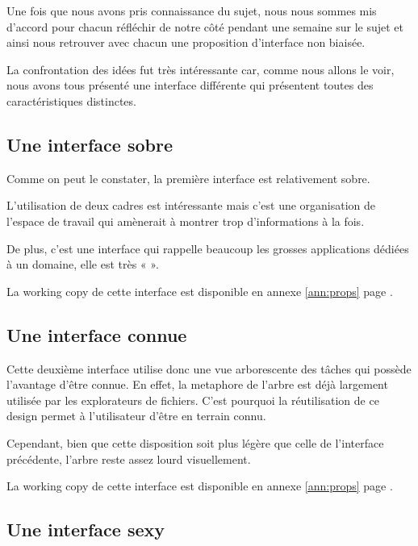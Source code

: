 \documentclass[11pt]{article}
\begin{document}
Une fois que nous avons pris connaissance du sujet, nous nous sommes
mis d'accord pour chacun réfléchir de notre côté pendant une semaine
sur le sujet et ainsi nous retrouver avec chacun une proposition
d'interface non biaisée.

La confrontation des idées fut très intéressante car, comme nous
allons le voir, nous avons tous présenté une interface différente qui
présentent toutes des caractéristiques distinctes.



\subsection{Une interface sobre}

Comme on peut le constater, la première interface est relativement
sobre.

L'utilisation de deux cadres est intéressante mais c'est une
organisation de l'espace de travail qui amènerait à montrer trop
d'informations à la fois.

De plus, c'est une interface qui rappelle beaucoup les grosses
applications dédiées à un domaine, elle est très «
». 

La working copy de cette interface est disponible en annexe
\ref{ann:props} page \pageref{fig:sobre}.


\subsection{Une interface connue}

Cette deuxième interface utilise donc une vue arborescente des tâches
qui possède l'avantage d'être connue. En effet, la \gls{metaphore} de
l'arbre est déjà largement utilisée par les explorateurs de fichiers.
C'est pourquoi la réutilisation de ce design permet à l'utilisateur
d'être en terrain connu.

Cependant, bien que cette disposition soit plus légère que celle de
l'interface précédente, l'arbre reste assez lourd visuellement.

La working copy de cette interface est disponible en annexe \ref{ann:props} page \pageref{fig:connue}.


\subsection{Une interface sexy}
\end{document}
